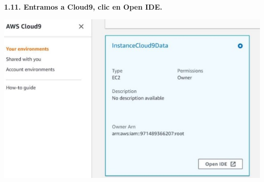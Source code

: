 \documentclass{article}
\begin{document}
	
		
	\newpage
\textbf{1.11.  Entramos a Cloud9, clic en Open IDE.
}

    \begin{center}
		\includegraphics[width=15cm]{./images/11} 
	\end{center}
	
	
\end{document}
